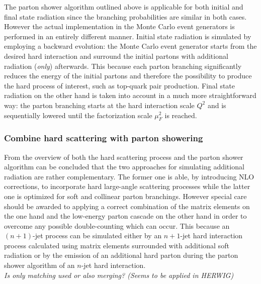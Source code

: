 The parton shower algorithm outlined above is applicable for both initial and final state radiation since the branching probabilities are similar in both cases. However the actual implementation in the Monte Carlo event generators is performed in an entirely different manner. 
Initial state radiation is simulated by employing a backward evolution: the Monte Carlo event generator starts from the desired hard interaction and surround the initial partons with additional radiation (\textit{only}) afterwards. This because each parton branching significantly reduces the energy of the initial partons and therefore the possibility to produce the hard process of interest, such as top-quark pair production. 
Final state radiation on the other hand is taken into account in a much more straightforward way: the parton branching starts at the hard interaction scale $Q^{2}$ and is sequentially lowered until the factorization scale $\mu_{F}^{2}$ is reached.

\subsubsection{Combine hard scattering with parton showering}
From the overview of both the hard scattering process and the parton shower algorithm can be concluded that the two approaches for simulating additional radiation are rather complementary. The former one is able, by introducing NLO corrections, to incorporate hard large-angle scattering processes while the latter one is optimized for soft and collinear parton branchings. However special care should be awarded to applying a correct combination of the matrix elements on the one hand and the low-energy parton cascade on the other hand in order to overcome any possible double-counting which can occur. This because an $(n+1)$-jet process can be simulated either by an $n+1$-jet hard interaction process calculated using matrix elements surrounded with additional soft radiation or by the emission of an additional hard parton during the parton shower algorithm of an $n$-jet hard interaction.
\\

\textit{Is only matching used or also merging? (Seems to be applied in HERWIG)}\\

